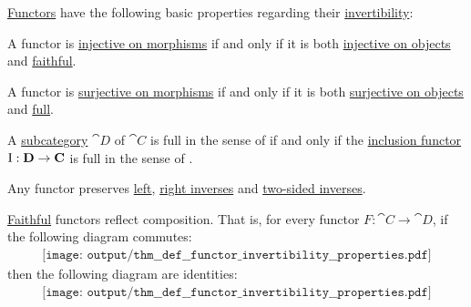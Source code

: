 \begin{proposition}\label{thm:def:functor_invertibility}
  \hyperref[def:functor]{Functors} have the following basic properties regarding their \hyperref[def:functor_invertibility]{invertibility}:

  \begin{thmenum}
     A functor is \hyperref[def:functor_invertibility/injective_on_morphisms]{injective on morphisms} if and only if it is both \hyperref[def:functor_invertibility/injective_on_objects]{injective on objects} and \hyperref[def:functor_invertibility/faithful]{faithful}.

     A functor is \hyperref[def:functor_invertibility/surjective_on_morphisms]{surjective on morphisms} if and only if it is both \hyperref[def:functor_invertibility/surjective_on_objects]{surjective on objects} and \hyperref[def:functor_invertibility/full]{full}.

     A \hyperref[def:subcategory]{subcategory} \( \cat{D} \) of \( \cat{C} \) is full in the sense of  if and only if the \hyperref[def:subcategory]{inclusion functor} \( \operatorname{I}: \operatorname{\mathbf{D}} \to \operatorname{\mathbf{C}} \) is full in the sense of .

     Any functor preserves \hyperref[def:morphism_invertibility/left_invertible]{left}, \hyperref[def:morphism_invertibility/right_invertible]{right inverses} and \hyperref[def:morphism_invertibility/isomorphism]{two-sided inverses}.

     \hyperref[def:functor_invertibility/faithful]{Faithful} functors reflect composition. That is, for every functor \( F: \cat{C} \to \cat{D} \), if the following diagram commutes:
    \begin{equation}\label{eq:thm:def:functor_invertibility/faithful_reflects_composition/image}
      \begin{aligned}
        \texttt{[image: output/thm\_\_def\_\_functor\_invertibility\_\_properties.pdf]}
      \end{aligned}
    \end{equation}
    then the following diagram are identities:
    \begin{equation}\label{eq:thm:def:functor_invertibility/faithful_reflects_composition/source}
      \begin{aligned}
        \texttt{[image: output/thm\_\_def\_\_functor\_invertibility\_\_properties.pdf]}
      \end{aligned}
    \end{equation}


\end{thmenum}
\end{proposition}

